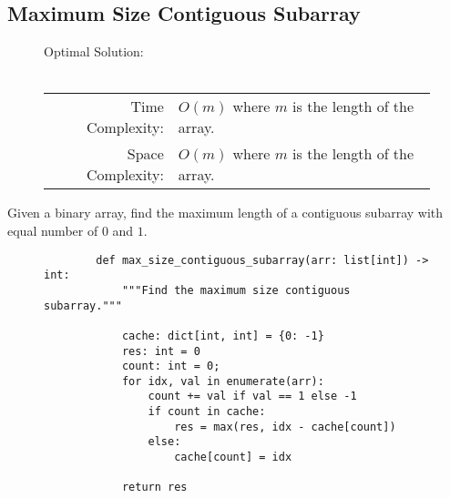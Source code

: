 
\subsection{Maximum Size Contiguous Subarray}

\begin{figure}[H]
    Optimal Solution:\\\\
    \begin{tabular}{rl}
        Time Complexity:& \(O(m)\) where \(m\) is the length of the array.\\
        Space Complexity:& \(O(m)\) where \(m\) is the length of the array.
    \end{tabular}
\end{figure}

Given a binary array, find the maximum length of a contiguous subarray with
equal number of \(0\) and \(1\).

\begin{figure}[H]
    \centering
    \begin{verbatim}
        def max_size_contiguous_subarray(arr: list[int]) -> int:
            """Find the maximum size contiguous subarray."""
            
            cache: dict[int, int] = {0: -1}
            res: int = 0
            count: int = 0;
            for idx, val in enumerate(arr):
                count += val if val == 1 else -1
                if count in cache:
                    res = max(res, idx - cache[count])
                else:
                    cache[count] = idx

            return res
    \end{verbatim}
\end{figure}
